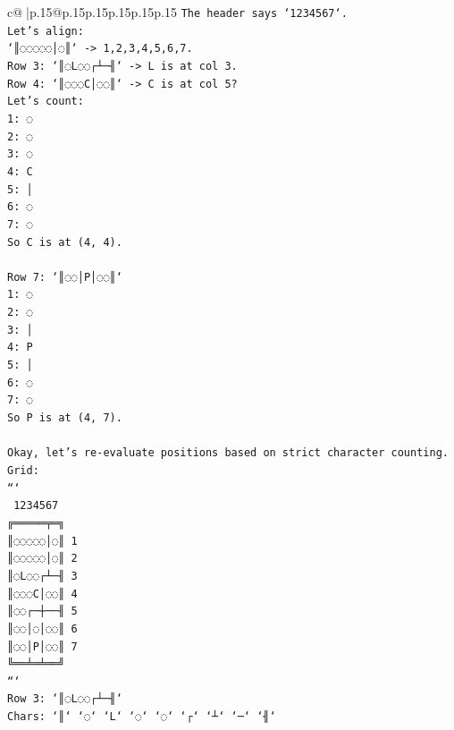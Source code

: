 \documentclass{article}
\begin{document}
{\begin{supertabular}{c@{$\;$}|p{.15\linewidth}@{}p{.15\linewidth}p{.15\linewidth}p{.15\linewidth}p{.15\linewidth}p{.15\linewidth}}
{{{\texttt{The header says `1234567`.} \\
\texttt{Let's align:} \\
\texttt{`║◌◌◌◌◌│◌║` {-}> 1,2,3,4,5,6,7.} \\
\texttt{Row 3: `║◌L◌◌┌┴─╢` {-}> L is at col 3.} \\
\texttt{Row 4: `║◌◌◌C│◌◌║` {-}> C is at col 5?} \\
\texttt{Let's count:} \\
\texttt{1: ◌} \\
\texttt{2: ◌} \\
\texttt{3: ◌} \\
\texttt{4: C} \\
\texttt{5: │} \\
\texttt{6: ◌} \\
\texttt{7: ◌} \\
\texttt{So C is at (4, 4).} \\
\\ 
\texttt{Row 7: `║◌◌│P│◌◌║`} \\
\texttt{1: ◌} \\
\texttt{2: ◌} \\
\texttt{3: │} \\
\texttt{4: P} \\
\texttt{5: │} \\
\texttt{6: ◌} \\
\texttt{7: ◌} \\
\texttt{So P is at (4, 7).} \\
\\ 
\texttt{Okay, let's re{-}evaluate positions based on strict character counting.} \\
\texttt{Grid:} \\
\texttt{```} \\
\texttt{  1234567} \\
\texttt{╔═════╤═╗} \\
\texttt{║◌◌◌◌◌│◌║ 1} \\
\texttt{║◌◌◌◌◌│◌║ 2} \\
\texttt{║◌L◌◌┌┴─╢ 3} \\
\texttt{║◌◌◌C│◌◌║ 4} \\
\texttt{║◌◌┌─┼──╢ 5} \\
\texttt{║◌◌│◌│◌◌║ 6} \\
\texttt{║◌◌│P│◌◌║ 7} \\
\texttt{╚══╧═╧══╝} \\
\texttt{```} \\
\texttt{Row 3: `║◌L◌◌┌┴─╢`} \\
\texttt{Chars: `║` `◌` `L` `◌` `◌` `┌` `┴` `─` `╢`} \\
}}}
\end{supertabular}}
\end{document}
